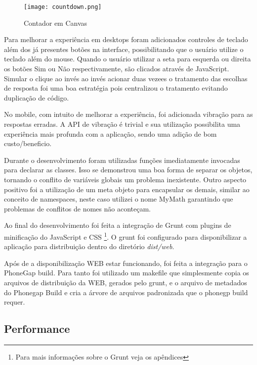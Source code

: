 \begin{figure}
    \centering
    \texttt{[image: countdown.png]}
	\caption{Contador em Canvas}
    \label{fig:counter}
\end{figure}

Para melhorar a experiência em desktops foram adicionados controles de
teclado além dos já presentes botões na interface, possibilitando que
o usuário utilize o teclado além do mouse. Quando o usuário utilizar
a seta para esquerda ou direita os botões Sim ou Não respectivamente,
são clicados através de JavaScript. Simular o clique ao invés ao
invés acionar duas vezees o tratamento das escolhas de resposta foi uma boa
estratégia pois centralizou o tratamento evitando duplicação de código.

No mobile, com intuito de melhorar a experiência, foi adicionada
vibração para as respostas erradas. A API de vibração é trivial e sua 
utilização possibilita uma experiência mais profunda com a aplicação, sendo 
uma adição de bom custo/beneficio.

Durante o desenvolvimento foram utilizadas funções imediatamente
invocadas para declarar as classes. Isso se demonstrou uma boa forma
de separar os objetos, tornando o conflito de variáveis globais um
problema inexistente. Outro aspecto positivo foi a utilização de
um meta objeto para encapsular os demais, similar ao conceito de
namespaces, neste caso utilizei o nome MyMath garantindo que problemas
de conflitos de nomes não aconteçam.

Ao final do desenvolvimento foi feita a integração de Grunt com
plugins de minificação do JavaScript e CSS \footnote{Para mais
informações sobre o Grunt veja os apêndices}. O grunt foi configurado 
para disponibilizar a aplicação para distribuição dentro do diretório
\textit{dist/web}. 

Após de a disponibilização WEB estar funcionando, foi feita a
integração para o PhoneGap build. Para tanto foi utilizado um makefile
que simplesmente copia os arquivos de distribuição da WEB, gerados
pelo grunt, e o arquivo de metadados do Phonegap Build e cria a árvore
de arquivos padronizada que o phonegp build requer.


\subsection{Performance}

